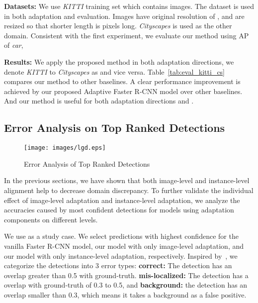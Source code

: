 \documentclass[10pt,twocolumn,letterpaper]{article}
\def\cs{\textit{Cityscapes} }
\def\kitti{\textit{KITTI} }
\begin{document}
\textbf{Datasets:} We use \kitti training set which contains  images. The dataset is used in both adaptation and evaluation. Images have original resolution of , and are resized so that shorter length is  pixels long. \cs is used as the other domain. Consistent with the first experiment, we evaluate our method using AP of \textit{car}, 

\textbf{Results:} We apply the proposed method in both adaptation directions, we denote \kitti to \cs as  and vice versa. Table~\ref{tab:eval_kitti_cs} compares our method to other baselines. A clear performance improvement is achieved by our proposed Adaptive Faster R-CNN model over other baselines. And our method is useful for both adaptation directions  and . 


\subsection{Error Analysis on Top Ranked Detections}
\begin{figure}
\centering
      \texttt{[image: images/lgd.eps]}
      \\
\hspace{1mm}
\caption{Error Analysis of Top Ranked Detections}
\label{fig:error_ana}
\vspace{-2mm}
\end{figure}

In the previous sections, we have shown that both image-level and instance-level alignment help to decrease domain discrepancy. To further validate the individual effect of image-level adaptation and instance-level adaptation, we analyze the accuracies caused by most confident detections for models using adaptation components on different levels. 

We use  as a study case. We select  predictions with highest confidence for the vanilla Faster R-CNN model, our model with only image-level adaptation, and our model with only instance-level adaptation, respectively.  Inspired by~\cite{hoiem2012diagnosing}, we categorize the detections into 3 error types: \textbf{correct:} The detection has an overlap greater than 0.5 with ground-truth. \textbf{mis-localized:} The detection has a overlap with ground-truth of 0.3 to 0.5, and \textbf{background:} the detection has an overlap smaller than 0.3, which means it takes a background as a false positive. 
\end{document}
